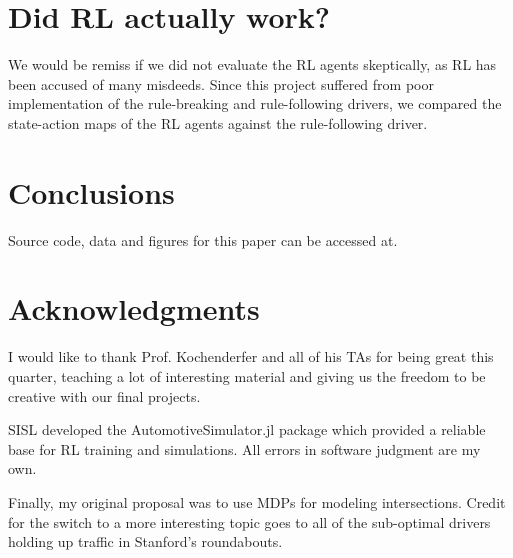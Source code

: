 \documentclass[conference]{IEEEtran}
\begin{document}


\section{Did RL actually work?} We would be remiss if we did not evaluate the RL agents skeptically, as RL has been accused of many misdeeds. %
Since this project suffered from poor implementation of the rule-breaking and rule-following drivers, we compared the state-action maps of the RL agents against the rule-following driver. 

\section*{Conclusions}

Source code, data and figures for this paper can be accessed at. %

\section*{Acknowledgments}
I would like to thank Prof. Kochenderfer and all of his TAs for being great this quarter, teaching a lot of interesting material and giving us the freedom to be creative with our final projects.

SISL developed the AutomotiveSimulator.jl package which provided a reliable base for RL training and simulations. All errors in software judgment are my own.

Finally, my original proposal was to use MDPs for modeling intersections. Credit for the switch to a more interesting topic goes to all of the sub-optimal drivers holding up traffic in Stanford's roundabouts.


\end{document}
